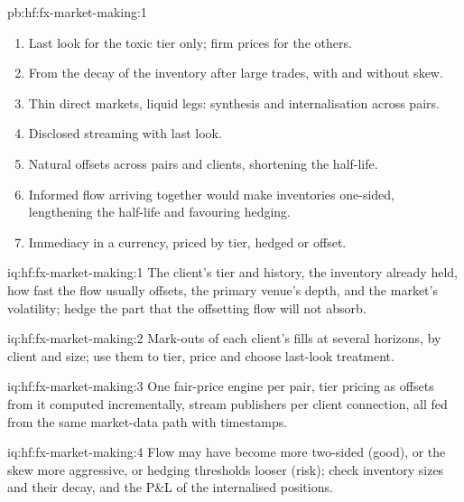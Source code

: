 \begin{solution}{pb:hf:fx-market-making:1}
\begin{enumerate}
\item Last look for the toxic tier only; firm prices for the others.
\item From the decay of the inventory after large trades, with and without skew.
\item Thin direct markets, liquid legs: synthesis and internalisation across pairs.
\item Disclosed streaming with last look.
\item Natural offsets across pairs and clients, shortening the half-life.
\item Informed flow arriving together would make inventories one-sided, lengthening the half-life and favouring hedging.
\item Immediacy in a currency, priced by tier, hedged or offset.
\end{enumerate}
\end{solution}

\begin{solution}{iq:hf:fx-market-making:1}
The client's tier and history, the inventory already held, how fast the flow usually offsets, the primary venue's depth, and the market's
volatility; hedge the part that the offsetting flow will not absorb.
\end{solution}

\begin{solution}{iq:hf:fx-market-making:2}
Mark-outs of each client's fills at several horizons, by client and size; use them to tier, price and choose last-look treatment.
\end{solution}

\begin{solution}{iq:hf:fx-market-making:3}
One fair-price engine per pair, tier pricing as offsets from it computed incrementally, stream publishers per client connection, all fed from the
same market-data path with timestamps.
\end{solution}

\begin{solution}{iq:hf:fx-market-making:4}
Flow may have become more two-sided (good), or the skew more aggressive, or hedging thresholds looser (risk); check inventory sizes and their decay,
and the P\&L of the internalised positions.
\end{solution}

